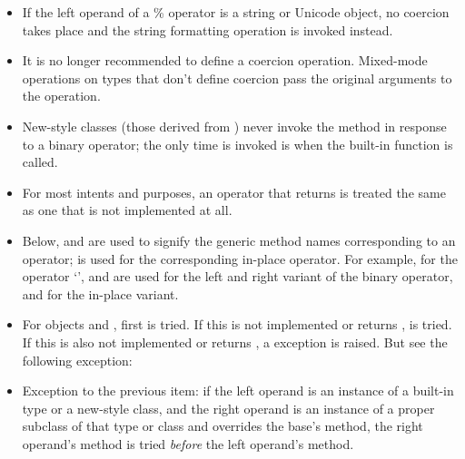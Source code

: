 \begin{itemize}

\item

If the left operand of a \% operator is a string or Unicode object, no
coercion takes place and the string formatting operation is invoked
instead.

\item

It is no longer recommended to define a coercion operation.
Mixed-mode operations on types that don't define coercion pass the
original arguments to the operation.

\item

New-style classes (those derived from ) never invoke the
 method in response to a binary operator; the only
time  is invoked is when the built-in function
 is called.

\item

For most intents and purposes, an operator that returns
 is treated the same as one that is not
implemented at all.

\item

Below,  and  are used to signify
the generic method names corresponding to an operator;
 is used for the corresponding in-place operator.  For
example, for the operator `\code{+}',  and
 are used for the left and right variant of the
binary operator, and  for the in-place variant.

\item

For objects  and , first 
is tried.  If this is not implemented or returns ,
 is tried.  If this is also not
implemented or returns , a 
exception is raised.  But see the following exception:

\item

Exception to the previous item: if the left operand is an instance of
a built-in type or a new-style class, and the right operand is an instance
of a proper subclass of that type or class and overrides the base's
 method, the right operand's  method
is tried \emph{before} the left operand's  method.


\end{itemize}
